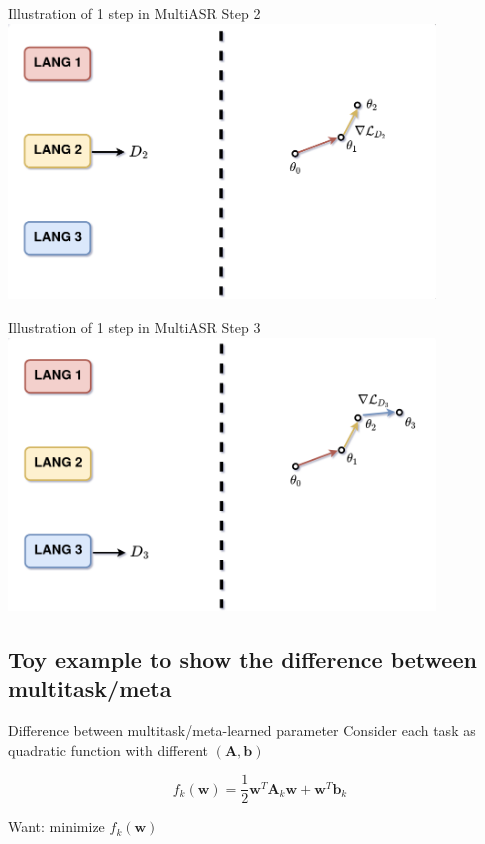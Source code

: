 \documentclass{beamer}
\begin{document}
\begin{frame}[t]{Illustration of 1 step in MultiASR}
  Step 2 
  \center \includegraphics[width=0.85\textwidth]{fig/multi_step2.png}
\end{frame}

\begin{frame}[t]{Illustration of 1 step in MultiASR}
  Step 3 
  \center \includegraphics[width=0.85\textwidth]{fig/multi_step3.png}
\end{frame}

\subsection{Toy example to show the difference between multitask/meta}
\begin{frame}[t]{Difference between multitask/meta-learned parameter}
\label{another example}
  Consider each task as quadratic function with different $(\mathbf{A}, \mathbf{b})$

  \begin{equation*}
    f_k(\mathbf{w}) = \frac{1}{2} \mathbf{w}^T \mathbf{A}_k \mathbf{w} + \mathbf{w}^T \mathbf{b}_k
  \end{equation*}

  Want: minimize $f_k(\mathbf{w})$
\end{frame}
\end{document}
